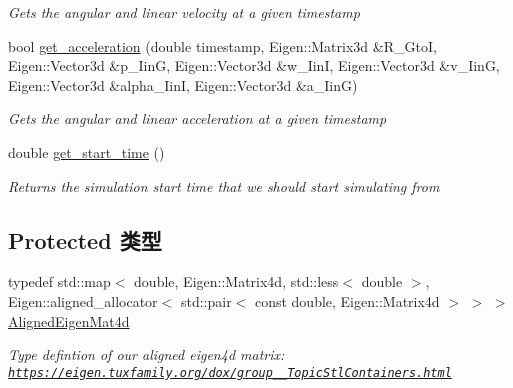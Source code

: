 \begin{DoxyCompactItemize}
\begin{DoxyCompactList}\small\item\em Gets the angular and linear velocity at a given timestamp \end{DoxyCompactList}\item 
bool \hyperlink{classov__core_1_1BsplineSE3_a487ddccc242464c38111489d325a7479}{get\+\_\+acceleration} (double timestamp, Eigen\+::\+Matrix3d \&R\+\_\+\+GtoI, Eigen\+::\+Vector3d \&p\+\_\+\+IinG, Eigen\+::\+Vector3d \&w\+\_\+\+IinI, Eigen\+::\+Vector3d \&v\+\_\+\+IinG, Eigen\+::\+Vector3d \&alpha\+\_\+\+IinI, Eigen\+::\+Vector3d \&a\+\_\+\+IinG)
\begin{DoxyCompactList}\small\item\em Gets the angular and linear acceleration at a given timestamp \end{DoxyCompactList}\item 
\mbox{\label{classov__core_1_1BsplineSE3_ae44f184ee4052cf65d8161063dc9ecae}} 
double \hyperlink{classov__core_1_1BsplineSE3_ae44f184ee4052cf65d8161063dc9ecae}{get\+\_\+start\+\_\+time} ()
\begin{DoxyCompactList}\small\item\em Returns the simulation start time that we should start simulating from \end{DoxyCompactList}\end{DoxyCompactItemize}
\subsection*{Protected 类型}
\begin{DoxyCompactItemize}
\item 
\mbox{\label{classov__core_1_1BsplineSE3_a2e0b3cb7cef84db7b84598f2ea01e00d}} 
typedef std\+::map$<$ double, Eigen\+::\+Matrix4d, std\+::less$<$ double $>$, Eigen\+::aligned\+\_\+allocator$<$ std\+::pair$<$ const double, Eigen\+::\+Matrix4d $>$ $>$ $>$ \hyperlink{classov__core_1_1BsplineSE3_a2e0b3cb7cef84db7b84598f2ea01e00d}{Aligned\+Eigen\+Mat4d}
\begin{DoxyCompactList}\small\item\em Type defintion of our aligned eigen4d matrix\+: \href{https://eigen.tuxfamily.org/dox/group__TopicStlContainers.html}{\tt https\+://eigen.\+tuxfamily.\+org/dox/group\+\_\+\+\_\+\+Topic\+Stl\+Containers.\+html} \end{DoxyCompactList}\end{DoxyCompactItemize}
